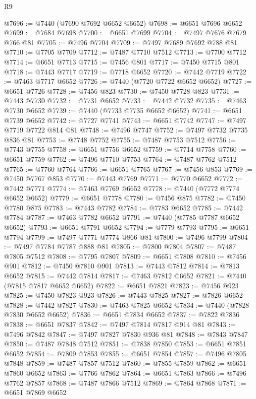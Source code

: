 \begin{lexlean}{R9}
\begin{coremodule}
@7696 := @7440 (@7690 @7692 @6652 @6652)
@7698 := @6651 @7696 @6652
@7699 := @7684 @7698
@7700 := @6651 @7699
@7704 := @7497 @7676 @7679 @766 @81
@7705 := @7496 @7704
@7709 := @7497 @7689 @7692 @788 @81
@7710 := @7705 @7709
@7712 := @7487 @7710 @7512
@7713 := @7700 @7712
@7714 := @6651 @7713
@7715 := @7456 @801
@7717 := @7450 @7715 @801
@7718 := @7443 @7717
@7719 := @7718 @6652
@7720 := @7442 @7719
@7722 := @7463 @7717 @6652
@7726 := @7440 (@7720 @7722 @6652 @6652)
@7727 := @6651 @7726
@7728 := @7456 @823
@7730 := @7450 @7728 @823
@7731 := @7443 @7730
@7732 := @7731 @6652
@7733 := @7442 @7732
@7735 := @7463 @7730 @6652
@7739 := @7440 (@7733 @7735 @6652 @6652)
@7741 := @6651 @7739 @6652
@7742 := @7727 @7741
@7743 := @6651 @7742
@7747 := @7497 @7719 @7722 @814 @81
@7748 := @7496 @7747
@7752 := @7497 @7732 @7735 @836 @81
@7753 := @7748 @7752
@7755 := @7487 @7753 @7512
@7756 := @7743 @7755
@7758 := @6651 @7756 @6652
@7759 := @7714 @7758
@7760 := @6651 @7759
@7762 := @7496 @7710 @7753
@7764 := @7487 @7762 @7512
@7765 := @7760 @7764
@7766 := @6651 @7765
@7767 := @7456 @853
@7769 := @7450 @7767 @853
@7770 := @7443 @7769
@7771 := @7770 @6652
@7772 := @7442 @7771
@7774 := @7463 @7769 @6652
@7778 := @7440 (@7772 @7774 @6652 @6652)
@7779 := @6651 @7778
@7780 := @7456 @875
@7782 := @7450 @7780 @875
@7783 := @7443 @7782
@7784 := @7783 @6652
@7785 := @7442 @7784
@7787 := @7463 @7782 @6652
@7791 := @7440 (@7785 @7787 @6652 @6652)
@7793 := @6651 @7791 @6652
@7794 := @7779 @7793
@7795 := @6651 @7794
@7799 := @7497 @7771 @7774 @866 @81
@7800 := @7496 @7799
@7804 := @7497 @7784 @7787 @888 @81
@7805 := @7800 @7804
@7807 := @7487 @7805 @7512
@7808 := @7795 @7807
@7809 := @6651 @7808
@7810 := @7456 @901
@7812 := @7450 @7810 @901
@7813 := @7443 @7812
@7814 := @7813 @6652
@7815 := @7442 @7814
@7817 := @7463 @7812 @6652
@7821 := @7440 (@7815 @7817 @6652 @6652)
@7822 := @6651 @7821
@7823 := @7456 @923
@7825 := @7450 @7823 @923
@7826 := @7443 @7825
@7827 := @7826 @6652
@7828 := @7442 @7827
@7830 := @7463 @7825 @6652
@7834 := @7440 (@7828 @7830 @6652 @6652)
@7836 := @6651 @7834 @6652
@7837 := @7822 @7836
@7838 := @6651 @7837
@7842 := @7497 @7814 @7817 @914 @81
@7843 := @7496 @7842
@7847 := @7497 @7827 @7830 @936 @81
@7848 := @7843 @7847
@7850 := @7487 @7848 @7512
@7851 := @7838 @7850
@7853 := @6651 @7851 @6652
@7854 := @7809 @7853
@7855 := @6651 @7854
@7857 := @7496 @7805 @7848
@7859 := @7487 @7857 @7512
@7860 := @7855 @7859
@7862 := @6651 @7860 @6652
@7863 := @7766 @7862
@7864 := @6651 @7863
@7866 := @7496 @7762 @7857
@7868 := @7487 @7866 @7512
@7869 := @7864 @7868
@7871 := @6651 @7869 @6652

\end{coremodule}
\end{lexlean}

